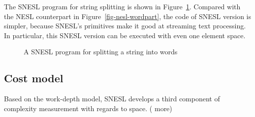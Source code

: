 The SNESL program for string splitting is shown in Figure~\ref{fig-snesl-wordpart}. 
Compared with the NESL counterpart in Figure~\ref{fig-nesl-wordpart}, the code of SNESL version is simpler, because SNESL's primitives make it good at streaming text processing. 
In particular, this SNESL version can be executed with even one element space.
 
\begin{figure}[H]
	 
	\caption{{A SNESL program for splitting a string into words \label{fig-snesl-wordpart}}}
\end{figure}


\subsection{Cost model}
Based on the work-depth model, SNESL develops a third component of complexity measurement with regards to space.
(%
more)

%	
%
